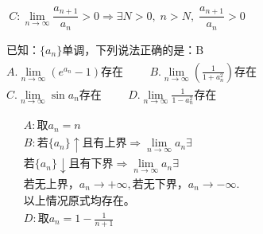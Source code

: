 \documentclass[cn,cyan,fleqn]{elegantbook}
\begin{document}
\begin{solution}
\begin{equation*}
    C: \lim\limits_{n\to \infty}\frac{a_{n+1}}{a_n}>0\Rightarrow \exists N>0,\;n>N,\;\frac{a_{n+1}}{a_n}>0
\end{equation*}
\end{solution}
\begin{problem}
\begin{equation*}
  \begin{aligned}
  &\mbox{已知：}\{a_n\}\mbox{单调，下列说法正确的是：B}\\
  &A. \lim\limits_{n\to \infty}(e^{a_n}-1)\mbox{存在}\hspace{1cm}B. \lim\limits_{n\to\infty}(\frac{1}{1+a_n^2})\mbox{存在}\\
  &C. \lim\limits_{n\to\infty}\sin a_n\mbox{存在}\hspace{1cm}D. \lim\limits_{n\to\infty}\frac{1}{1-a_n^2}\mbox{存在}
  \end{aligned}
\end{equation*}
\end{problem}
\begin{solution}
\begin{equation}\nonumber
  \begin{aligned}
  &A: \mbox{取}a_n=n\\
  &B: \mbox{若}\{a_n\}\uparrow\mbox{且有上界}\Rightarrow\lim\limits_{n\to\infty}a_n\exists\\
  &\mbox{若}\{a_n\}\downarrow\mbox{且有下界}\Rightarrow\lim\limits_{n\to\infty}a_n\exists\\
  &\mbox{若无上界，}a_n\to +\infty,\mbox{若无下界，}a_n\to -\infty.\\
  &\mbox{以上情况原式均存在。}\\
  &D:\mbox{取}a_n=1-\frac{1}{n+1}
  \end{aligned}
\end{equation}
\end{solution}
\end{document}
